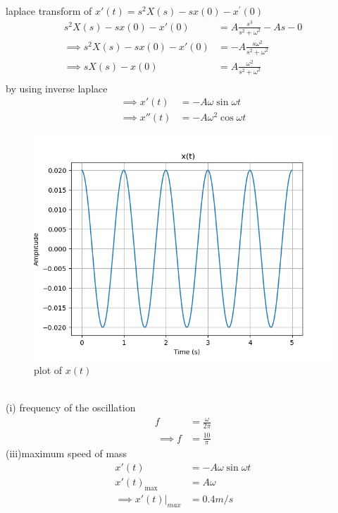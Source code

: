 \documentclass[journal,12pt,twocolumn]{IEEEtran}
\theoremstyle{remark}
\begin{document}
laplace transform of  $x'(t)=s^2X(s)-sx(0)-x^{'}(0)$
\begin{align}
s^2X(s)-sx(0)-x'(0)&=A\frac{s^3}{s^2+\omega^2}-As-0\\
\implies s^2X(s)-sx(0)-x'(0)&=-A\frac{s\omega^2}{s^2+\omega^2}\\
\implies sX(s)-x(0)&=A\frac{\omega^2}{s^2+\omega^2}\\
\end{align}
by using inverse laplace
\begin{align}
\implies x'(t)&=-A\omega\sin{\omega t}\\
\implies x''(t)&=-A\omega^2 \cos{\omega t}
\end{align}
\begin{figure}[h!]
    \centering
    \includegraphics[width=1.1\linewidth]{figs/analog1.png}
    \caption{plot of $x(t)$}
\end{figure}\\
(i) frequency of the oscillation
\begin{align}
    f&=\frac{\omega}{2\pi}\\\
    \implies f&=\frac{10}{\pi}
\end{align}
(iii)maximum speed of mass\\
\begin{align}
    x'(t)&=-A\omega\sin{\omega t}\\
  x'(t)_{\text{max}}&=A\omega\\
    \implies x'(t)\Bigr|_{max} &= 0.4 m/s
\end{align}
\end{document}
